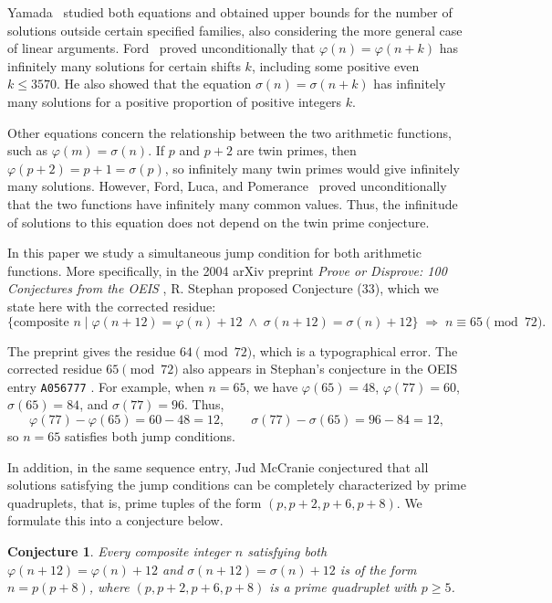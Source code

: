 \documentclass[12pt, twoside]{amsart}
\newtheorem{conjecture}[theorem]{Conjecture}
\theoremstyle{definition}
\begin{document}
Yamada~\cite{Yamada2017} studied both equations and obtained upper bounds for the number of solutions outside certain specified families, also considering the more general case of linear arguments. Ford~\cite{Ford2022} proved unconditionally that $\varphi(n)=\varphi(n+k)$ has infinitely many solutions for certain shifts $k$, including some positive even $k\leq3570$. He also showed that the equation $\sigma(n)=\sigma(n+k)$ has infinitely many solutions for a positive proportion of positive integers $k$.

Other equations concern the relationship between the two arithmetic functions, such as $\varphi(m)=\sigma(n)$. If $p$ and $p+2$ are twin primes, then $\varphi(p+2)=p+1=\sigma(p)$, so infinitely many twin primes would give infinitely many solutions. However, Ford, Luca, and Pomerance~\cite{FordLucaPomerance2010} proved unconditionally that the two functions have infinitely many common values. Thus, the infinitude of solutions to this equation does not depend on the twin prime conjecture.

In this paper we study a simultaneous jump condition for both
arithmetic functions. More specifically, in the 2004 arXiv preprint
\emph{Prove or Disprove: 100 Conjectures from the OEIS}
\cite{Stephan}, R. Stephan proposed Conjecture (33), which we
state here with the corrected residue:
\begin{equation}\label{eq:stephan33}
\bigl\{\text{composite } n \;\big|\; \varphi(n+12) = \varphi(n) + 12 \;\wedge\; \sigma(n+12) = \sigma(n) + 12\bigr\}
\;\Longrightarrow\; n \equiv 65 \pmod{72}.
\end{equation}

The preprint gives the residue $64\pmod{72}$, which is a
typographical error. The corrected residue $65\pmod{72}$ 
also appears in Stephan's conjecture in the OEIS entry
\texttt{A056777} \cite{OEIS-A056777}. 
For example, when $n=65$, we have $\varphi(65)=48$,
$\varphi(77)=60$, $\sigma(65)=84$, and $\sigma(77)=96$.
Thus,
\[
\varphi(77)-\varphi(65)=60-48=12,
\qquad
\sigma(77)-\sigma(65)=96-84=12,
\]
so $n=65$ satisfies both jump conditions.

In addition, in the same sequence entry, Jud McCranie conjectured that all solutions satisfying the jump conditions can be completely characterized by prime quadruplets, that is, prime tuples of the form $(p,p+2,p+6,p+8)$. We formulate this into a conjecture below.

\begin{conjecture}\label{McCranie}
    Every composite integer $n$ satisfying both $\varphi(n+12) = \varphi(n) + 12$ and $\sigma(n+12) = \sigma(n) + 12$ is of the form $n=p(p+8)$, where $(p,p+2,p+6,p+8)$ is a prime quadruplet with $p\ge5$. 
\end{conjecture}
\end{document}
